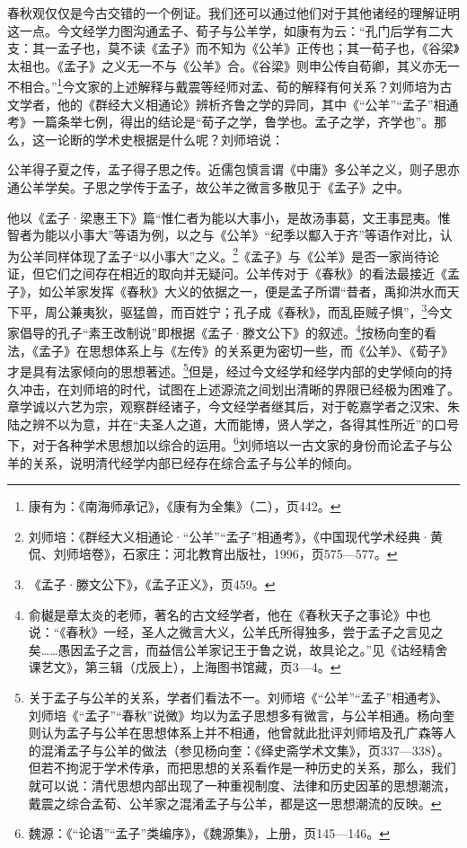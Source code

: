 \documentclass[a4paper, 12pt, openright]{ctexbook}
\renewenvironment{quote}
  {\list{}{\rightmargin2\ccwd \leftmargin2\ccwd \itemindent=2\ccwd \listparindent=2\ccwd}%
   \item\relax\small\kaishu\color{black}}
  {\endlist}
\begin{document}
春秋观仅仅是今古交错的一个例证。我们还可以通过他们对于其他诸经的理解证明这一点。今文经学力图沟通孟子、荀子与公羊学，如康有为云：“孔门后学有二大支：其一孟子也，莫不读《孟子》而不知为《公羊》正传也；其一荀子也，《谷梁》太祖也。《孟子》之义无一不与《公羊》合。《谷梁》则申公传自荀卿，其义亦无一不相合。”\footnote{康有为：《南海师承记》，《康有为全集》（二），页442。}今文家的上述解释与戴震等经师对孟、荀的解释有何关系？刘师培为古文学者，他的《群经大义相通论》辨析齐鲁之学的异同，其中《“公羊”“孟子”相通考》一篇条举七例，得出的结论是“荀子之学，鲁学也。孟子之学，齐学也”。那么，这一论断的学术史根据是什么呢？刘师培说：

\begin{quote}
公羊得子夏之传，孟子得子思之传。近儒包慎言谓《中庸》多公羊之义，则子思亦通公羊学矣。子思之学传于孟子，故公羊之微言多散见于《孟子》之中。
\end{quote}

他以《孟子·梁惠王下》篇“惟仁者为能以大事小，是故汤事葛，文王事昆夷。惟智者为能以小事大”等语为例，以之与《公羊》“纪季以酅入于齐”等语作对比，认为公羊同样体现了孟子“以小事大”之义。\footnote{刘师培：《群经大义相通论·“公羊”“孟子”相通考》，《中国现代学术经典·黄侃、刘师培卷》，石家庄：河北教育出版社，1996，页575—577。}《孟子》与《公羊》是否一家尚待论证，但它们之间存在相近的取向并无疑问。公羊传对于《春秋》的看法最接近《孟子》，如公羊家发挥《春秋》大义的依据之一，便是孟子所谓“昔者，禹抑洪水而天下平，周公兼夷狄，驱猛兽，而百姓宁；孔子成《春秋》，而乱臣贼子惧”，\footnote{《孟子·滕文公下》，《孟子正义》，页459。}今文家倡导的孔子“素王改制说”即根据《孟子·滕文公下》的叙述。\footnote{俞樾是章太炎的老师，著名的古文经学者，他在《春秋天子之事论》中也说：“《春秋》一经，圣人之微言大义，公羊氏所得独多，尝于孟子之言见之矣……愚因孟子之言，而益信公羊家记王于鲁之说，故具论之。”见《诂经精舍课艺文》，第三辑（戊辰上），上海图书馆藏，页3—4。}按杨向奎的看法，《孟子》在思想体系上与《左传》的关系更为密切一些，而《公羊》、《荀子》才是具有法家倾向的思想著述。\footnote{关于孟子与公羊的关系，学者们看法不一。刘师培《“公羊”“孟子”相通考》、刘师培《“孟子”“春秋”说微》均以为孟子思想多有微言，与公羊相通。杨向奎则认为孟子与公羊在思想体系上并不相通，他曾就此批评刘师培及孔广森等人的混淆孟子与公羊的做法（参见杨向奎：《绎史斋学术文集》，页337—338）。但若不拘泥于学术传承，而把思想的关系看作是一种历史的关系，那么，我们就可以说：清代思想内部出现了一种重视制度、法律和历史因革的思想潮流，戴震之综合孟荀、公羊家之混淆孟子与公羊，都是这一思想潮流的反映。}但是，经过今文经学和经学内部的史学倾向的持久冲击，在刘师培的时代，试图在上述源流之间划出清晰的界限已经极为困难了。章学诚以六艺为宗，观察群经诸子，今文经学者继其后，对于乾嘉学者之汉宋、朱陆之辨不以为意，并在“夫圣人之道，大而能博，贤人学之，各得其性所近”的口号下，对于各种学术思想加以综合的运用。\footnote{魏源：《“论语”“孟子”类编序》，《魏源集》，上册，页145—146。}刘师培以一古文家的身份而论孟子与公羊的关系，说明清代经学内部已经存在综合孟子与公羊的倾向。
\end{document}
